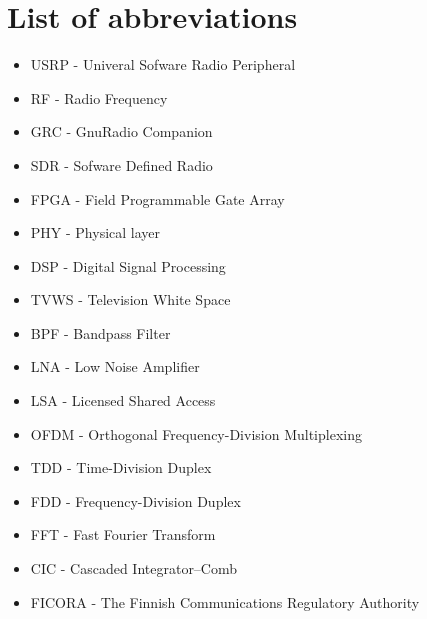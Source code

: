 \section*{List of abbreviations}



\begin{itemize}
\tightlist
\item
  USRP - Univeral Sofware Radio Peripheral
\item
  RF - Radio Frequency
\item
  GRC - GnuRadio Companion
\item
  SDR - Sofware Defined Radio
\item
  FPGA - Field Programmable Gate Array
\item
  PHY - Physical layer
\item
  DSP - Digital Signal Processing
\item
  TVWS - Television White Space
\item
  BPF - Bandpass Filter
\item
  LNA - Low Noise Amplifier
\item
  LSA - Licensed Shared Access
\item
  OFDM - Orthogonal Frequency-Division Multiplexing
\item
  TDD - Time-Division Duplex
\item
  FDD - Frequency-Division Duplex
\item
  FFT - Fast Fourier Transform
\item
  CIC - Cascaded Integrator–Comb
\item
  FICORA - The Finnish Communications Regulatory Authority
\end{itemize}
